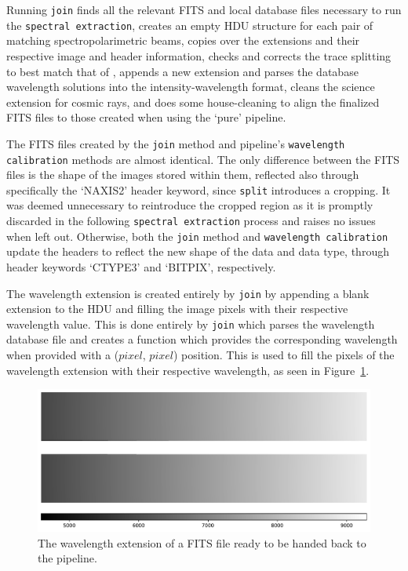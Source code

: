 Running \texttt{join} finds all the relevant \gls{FITS} and local database files necessary to run the \polsalt \texttt{spectral extraction}, creates an empty \gls{HDU} structure for each pair of matching spectropolarimetric beams, copies over the extensions and their respective image and header information, checks and corrects the trace splitting to best match that of \polsalt, appends a new extension and parses the database wavelength solutions into the \polsalt intensity-wavelength format, cleans the science extension for cosmic rays, and does some house-cleaning to align the finalized \gls{FITS} files to those created when using the `pure' \polsalt pipeline.
\prgph

The \gls{FITS} files created by the \texttt{join} method and \polsalt pipeline's \texttt{wavelength calibration} methods are almost identical. The only difference between the \gls{FITS} files is the shape of the images stored within them, reflected also through specifically the `NAXIS2' header keyword, since \texttt{split} introduces a cropping. It was deemed unnecessary to reintroduce the cropped region as it is promptly discarded in the following \polsalt \texttt{spectral extraction} process and raises no issues when left out. Otherwise, both the \texttt{join} method and \polsalt \texttt{wavelength calibration} update the headers to reflect the new shape of the data and data type, through header keywords `CTYPE3' and `BITPIX', respectively.
\prgph

The wavelength extension is created entirely by \texttt{join} by appending a blank extension to the \gls{HDU} and filling the image pixels with their respective wavelength value. This is done entirely by \texttt{join} which parses the wavelength database file and creates a function which provides the corresponding wavelength when provided with a ($pixel$, $pixel$) position. This is used to fill the pixels of the wavelength extension with their respective wavelength, as seen in Figure~\ref{fig:pol_wav_ext}.

\begin{figure}[t]
    \centering
    \includegraphics[width = 1.0\textwidth]{figures/3_pol_wav_ext.pdf}
    \caption{The wavelength extension of a \gls{FITS} file ready to be handed back to the \polsalt pipeline.}
    \label{fig:pol_wav_ext}
\end{figure}


